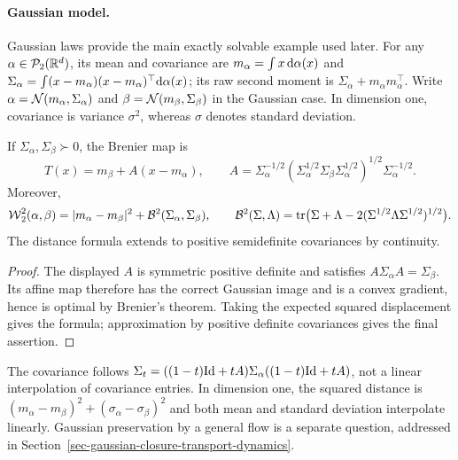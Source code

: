 \paragraph{Gaussian model.}\label{sec-gaussian-bures}
Gaussian laws provide the main exactly solvable example used later. For any $\alpha\in\mathcal{P}_2(\mathbb{R}^d)$, its mean and covariance are $m_\alpha=\int x\,\mathrm{d}\alpha(x)$ and $\Sigma_\alpha=\int(x-m_\alpha)(x-m_\alpha)^\top\mathrm{d}\alpha(x)$; its raw second moment is $\Sigma_\alpha+m_\alpha m_\alpha^\top$. Write $\alpha=\mathcal{N}(m_\alpha,\Sigma_\alpha)$ and $\beta=\mathcal{N}(m_\beta,\Sigma_\beta)$ in the Gaussian case. In dimension one, covariance is variance $\sigma^2$, whereas $\sigma$ denotes standard deviation.
\begin{prop}\label{prop-gaussian-w2-bures}
If $\Sigma_\alpha,\Sigma_\beta\succ0$, the Brenier map is
\begin{equation}\label{eq-bures-map}
  T(x)=m_\beta+A(x-m_\alpha),\qquad
  A=\Sigma_\alpha^{-1/2}(\Sigma_\alpha^{1/2}\Sigma_\beta\Sigma_\alpha^{1/2})^{1/2}\Sigma_\alpha^{-1/2}.
\end{equation}
Moreover,
\begin{equation}\label{eq-dist-gauss}
  \operatorname{\mathcal{W}}_2^2(\alpha,\beta)=|m_\alpha-m_\beta|^2+\mathcal{B}^2(\Sigma_\alpha,\Sigma_\beta),\qquad
  \mathcal{B}^2(\Sigma,\Lambda)=\operatorname{tr}\bigl(\Sigma+\Lambda-2(\Sigma^{1/2}\Lambda\Sigma^{1/2})^{1/2}\bigr).
\end{equation}
The distance formula extends to positive semidefinite covariances by continuity.
\end{prop}
\begin{proof}
The displayed $A$ is symmetric positive definite and satisfies $A\Sigma_\alpha A=\Sigma_\beta$. Its affine map therefore has the correct Gaussian image and is a convex gradient, hence is optimal by Brenier's theorem. Taking the expected squared displacement gives the formula; approximation by positive definite covariances gives the final assertion.
\end{proof}
The covariance follows $\Sigma_t=((1-t)\mathrm{Id}+tA)\Sigma_\alpha((1-t)\mathrm{Id}+tA)$, not a linear interpolation of covariance entries. In dimension one, the squared distance is $(m_\alpha-m_\beta)^2+(\sigma_\alpha-\sigma_\beta)^2$ and both mean and standard deviation interpolate linearly. Gaussian preservation by a general flow is a separate question, addressed in Section~\ref{sec-gaussian-closure-transport-dynamics}.

